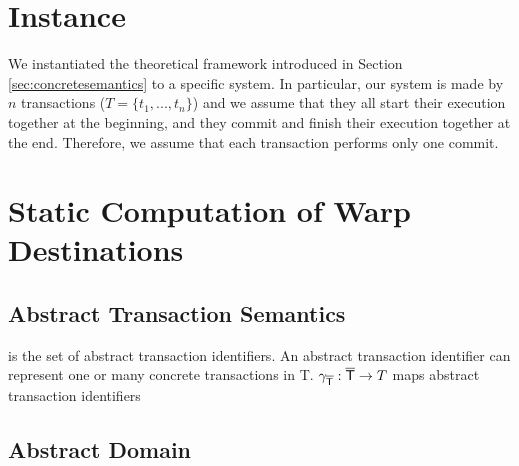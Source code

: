 \newcommand{\set}[1]{\mathsf{#1}}
\newcommand{\isSummary}{\set{summary}}
\newcommand{\freshNode}{\set{fresh}}
\newcommand{\heapnode}{\set{HeapNode}}
\newcommand{\variable}{\set{Var}}
\newcommand{\env}{\set{Env}}
\newcommand{\map}{\set{Map}}
\newcommand{\state}{\set{\Sigma}}
\newcommand{\serializedCFGs}{\set{serializedCFGs}}
\newcommand{\iseqclass}{\set{eqClass}}
\newcommand{\warpdestination}{\set{warpDest}}

\section{Instance}

We instantiated the theoretical framework introduced in Section \ref{sec:concretesemantics} to a specific system. In particular, our system is made by $n$ transactions ($T=\{t_1, ..., t_n\}$) and we assume that they all start their execution together at the beginning, and they commit and finish their execution together at the end. Therefore, we assume that each transaction performs only one commit.

\section{Static Computation of Warp Destinations}


\subsection{Abstract Transaction Semantics}
 is the set of abstract transaction identifiers. An abstract transaction identifier can represent one or many concrete transactions in T. $\gamma_{\mathsf{\overline{T}}} : \mathsf{\overline{T}} \to T$ maps abstract transaction identifiers 


\subsection{Abstract Domain}
\label{sect:abstractate}

